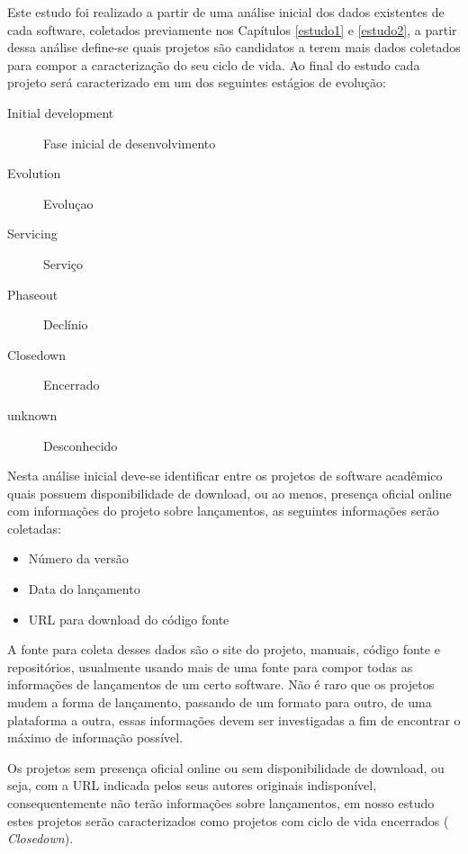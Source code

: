 Este estudo foi realizado a partir de uma análise inicial dos dados existentes
de cada software, coletados previamente nos Capítulos \ref{estudo1} e
\ref{estudo2}, a partir dessa análise define-se quais projetos são candidatos a
terem mais dados coletados para compor a caracterização do seu ciclo de vida. Ao
final do estudo cada projeto será caracterizado em um dos seguintes estágios
de evolução:

\begin{description}
  \item [Initial development] Fase inicial de desenvolvimento
  \item [Evolution] Evoluçao
  \item [Servicing] Serviço
  \item [Phaseout] Declínio
  \item [Closedown] Encerrado
  \item [unknown] Desconhecido
\end{description}

Nesta análise inicial deve-se identificar entre os projetos de software
acadêmico quais possuem disponibilidade de download, ou ao menos, presença
oficial online com informações do projeto sobre lançamentos, as seguintes
informações serão coletadas:

\begin{itemize}
  \item Número da versão
  \item Data do lançamento
  \item URL para download do código fonte
\end{itemize}

A fonte para coleta desses dados são o site do projeto, manuais, código fonte e
repositórios, usualmente usando mais de uma fonte para compor todas as
informações de lançamentos de um certo software. Não é raro que os projetos
mudem a forma de lançamento, passando de um formato para outro, de uma
plataforma a outra, essas informações devem ser investigadas a fim de encontrar
o máximo de informação possível.


Os projetos sem presença oficial online ou sem disponibilidade de download, ou
seja, com a URL indicada pelos seus autores originais indisponível,
consequentemente não terão informações sobre lançamentos, em nosso estudo estes
projetos serão caracterizados como projetos com ciclo de vida encerrados ({\it
Closedown}).

